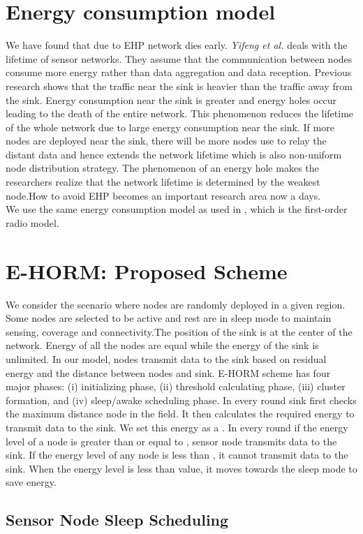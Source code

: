 \documentclass{article}
\begin{document}
\section{Energy consumption model}
\label{sec:typestyle}
We have found that due to EHP network dies early. \textit{Yifeng et al.} \cite{7} deals with the lifetime of sensor networks. They assume that the communication between nodes consume more energy rather than data aggregation and data reception. Previous research shows that the traffic near the sink is heavier than the traffic away from the sink. Energy consumption near the sink is greater and energy holes occur leading to the death of the entire network. This phenomenon reduces the lifetime of the whole network due to large energy consumption near the sink. If more nodes are deployed near the sink, there will be more nodes use to relay the distant data and hence extends the network lifetime which is also non-uniform node distribution strategy.
The phenomenon of an energy hole makes the researchers realize that the network lifetime is determined by the weakest node.How to avoid EHP becomes an important research area now a days.\\
We use the same energy consumption model as used in \cite{8}, which is the first-order radio model. \section{E-HORM: Proposed Scheme}
\label{sec:typestyle}
We consider the scenario where nodes are randomly deployed in a given region. Some nodes are selected to be active and rest are in sleep mode to maintain sensing, coverage and connectivity.The position of the sink is at the center of the network. Energy of all the nodes are equal while the energy of the sink is unlimited. In our model, nodes transmit data to the sink based on residual energy and the distance between nodes and sink.
E-HORM scheme has four major phases: (i) initializing phase, (ii) threshold calculating phase, (iii) cluster formation, and (iv) sleep/awake scheduling phase. In every round sink first checks the maximum distance node in the field. It then calculates the required energy to transmit data to the sink. We set this energy as a . In every round if the energy level of a node is greater than or equal to , sensor node transmits data to the sink. If the energy level of any node is less than , it cannot transmit data to the sink. When the energy level is less than  value, it moves towards the sleep mode to save energy. \subsection{Sensor Node Sleep Scheduling}
\end{document}
